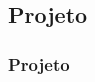 \subsection[Projeto]{Projeto}\label{subsec:sec99-projeto-1-projeto}



\begin{frame}[t]\frametitle{Projeto}


\end{frame}
